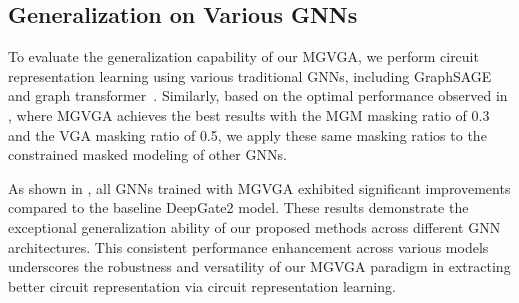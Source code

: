 \subsection{Generalization on Various GNNs}

To evaluate the generalization capability of our MGVGA, we perform circuit representation learning using various traditional GNNs, including GraphSAGE~\citep{hamilton2017graphsage} and graph transformer~\citep{shi2021transconv}.
Similarly, based on the optimal performance observed in , where MGVGA achieves the best results with the MGM masking ratio of 0.3 and the VGA masking ratio of 0.5, we apply these same masking ratios to the constrained masked modeling of other GNNs.

As shown in , all GNNs trained with MGVGA exhibited significant improvements compared to the baseline DeepGate2 model. 
These results demonstrate the exceptional generalization ability of our proposed methods across different GNN architectures. 
This consistent performance enhancement across various models underscores the robustness and versatility of our MGVGA paradigm in extracting better circuit representation via circuit representation learning.
